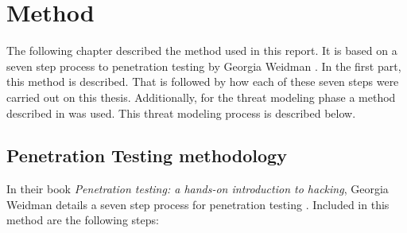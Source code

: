 \chapter{Method} \label{ch:method}
The following chapter described the method used in this report. It is based on a seven step process to penetration testing by Georgia Weidman \cite{weidman2014}. In the first part, this method is described. That is followed by how each of these seven steps were carried out on this thesis. Additionally, for the threat modeling phase a method described in \cite{guzman2017iot} was used. This threat modeling process is described below.

\section{Penetration Testing methodology}
In their book \textit{Penetration testing: a hands-on introduction to hacking}, Georgia Weidman details a seven step process for penetration testing \cite{weidman2014}. Included in this method are the following steps:
